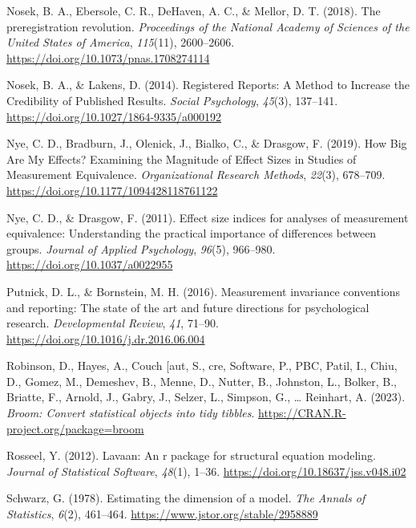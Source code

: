 \documentclass[
  man]{apa7}
\newlength{\cslhangindent}
\newlength{\cslentryspacingunit} %
\newenvironment{CSLReferences}[2] %
 {%
  \setlength{\parindent}{0pt}
  \ifodd #1
  \let\oldpar\par
  \def\par{\hangindent=\cslhangindent\oldpar}
  \fi
  \setlength{\parskip}{#2\cslentryspacingunit}
 }%
 {}
\begin{document}
\begin{CSLReferences}{1}{0}
\leavevmode{}%
Nosek, B. A., Ebersole, C. R., DeHaven, A. C., \& Mellor, D. T. (2018). The preregistration revolution. \emph{Proceedings of the National Academy of Sciences of the United States of America}, \emph{115}(11), 2600--2606. \url{https://doi.org/10.1073/pnas.1708274114}

\leavevmode{}%
Nosek, B. A., \& Lakens, D. (2014). Registered Reports: A Method to Increase the Credibility of Published Results. \emph{Social Psychology}, \emph{45}(3), 137--141. \url{https://doi.org/10.1027/1864-9335/a000192}

\leavevmode{}%
Nye, C. D., Bradburn, J., Olenick, J., Bialko, C., \& Drasgow, F. (2019). How Big Are My Effects? Examining the Magnitude of Effect Sizes in Studies of Measurement Equivalence. \emph{Organizational Research Methods}, \emph{22}(3), 678--709. \url{https://doi.org/10.1177/1094428118761122}

\leavevmode{}%
Nye, C. D., \& Drasgow, F. (2011). Effect size indices for analyses of measurement equivalence: Understanding the practical importance of differences between groups. \emph{Journal of Applied Psychology}, \emph{96}(5), 966--980. \url{https://doi.org/10.1037/a0022955}

\leavevmode{}%
Putnick, D. L., \& Bornstein, M. H. (2016). Measurement invariance conventions and reporting: The state of the art and future directions for psychological research. \emph{Developmental Review}, \emph{41}, 71--90. \url{https://doi.org/10.1016/j.dr.2016.06.004}

\leavevmode{}%
Robinson, D., Hayes, A., Couch {[}aut, S., cre, Software, P., PBC, Patil, I., Chiu, D., Gomez, M., Demeshev, B., Menne, D., Nutter, B., Johnston, L., Bolker, B., Briatte, F., Arnold, J., Gabry, J., Selzer, L., Simpson, G., \ldots{} Reinhart, A. (2023). \emph{Broom: Convert statistical objects into tidy tibbles}. \url{https://CRAN.R-project.org/package=broom}

\leavevmode{}%
Rosseel, Y. (2012). Lavaan: An r package for structural equation modeling. \emph{Journal of Statistical Software}, \emph{48}(1), 1--36. \url{https://doi.org/10.18637/jss.v048.i02}

\leavevmode{}%
Schwarz, G. (1978). Estimating the dimension of a model. \emph{The Annals of Statistics}, \emph{6}(2), 461--464. \url{https://www.jstor.org/stable/2958889}


\end{CSLReferences}
\end{document}
